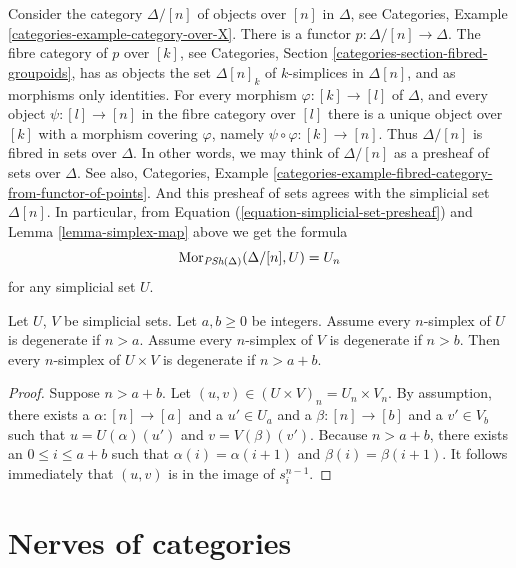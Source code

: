 \begin{example}
\label{example-simplex-category}
Consider the category $\Delta/[n]$ of objects over $[n]$
in $\Delta$, see
Categories, Example \ref{categories-example-category-over-X}.
There is a functor $p : \Delta/[n] \to \Delta$.
The fibre category of $p$ over $[k]$, see
Categories, Section \ref{categories-section-fibred-groupoids},
has as objects the
set $\Delta[n]_k$ of $k$-simplices in $\Delta[n]$, and as
morphisms only identities. For every morphism
$\varphi : [k] \to [l]$ of $\Delta$, and every object $\psi : [l] \to [n]$
in the fibre category over $[l]$ there is a unique
object over $[k]$ with a morphism covering $\varphi$, namely
$\psi \circ \varphi : [k] \to [n]$. Thus $\Delta/[n]$
is fibred in sets over $\Delta$. In other words, we may
think of $\Delta/[n]$ as a presheaf of sets over $\Delta$.
See also, Categories,
Example \ref{categories-example-fibred-category-from-functor-of-points}.
And this presheaf of sets agrees with the simplicial set
$\Delta[n]$. In particular, from Equation
(\ref{equation-simplicial-set-presheaf}) and
Lemma \ref{lemma-simplex-map} above
we get the formula
$$
\mathop{\mathrm{Mor}}\nolimits_{\textit{PSh}(\Delta)}(\Delta/[n], U) = U_n
$$
for any simplicial set $U$.
\end{example}

\begin{lemma}
\label{lemma-product-degenerate}
Let $U$, $V$ be simplicial sets.
Let $a, b \geq 0$ be integers.
Assume every $n$-simplex of $U$ is degenerate if $n > a$.
Assume every $n$-simplex of $V$ is degenerate if $n > b$.
Then every $n$-simplex of $U \times V$ is degenerate
if $n > a + b$.
\end{lemma}

\begin{proof}
Suppose $n > a + b$. Let $(u, v) \in (U \times V)_n = U_n \times V_n$.
By assumption, there exists a $\alpha : [n] \to [a]$ and a
$u' \in U_a$ and a $\beta : [n] \to [b]$ and a $v' \in V_b$
such that $u = U(\alpha)(u')$ and $v = V(\beta)(v')$. Because
$n > a + b$, there exists an $0 \leq i \leq a + b$ such that
$\alpha(i) = \alpha(i + 1)$ and
$\beta(i) = \beta(i + 1)$. It follows immediately
that $(u, v)$ is in the image of $s^{n - 1}_i$.
\end{proof}



\section{Nerves of categories}
\label{section-nerves-categories}

